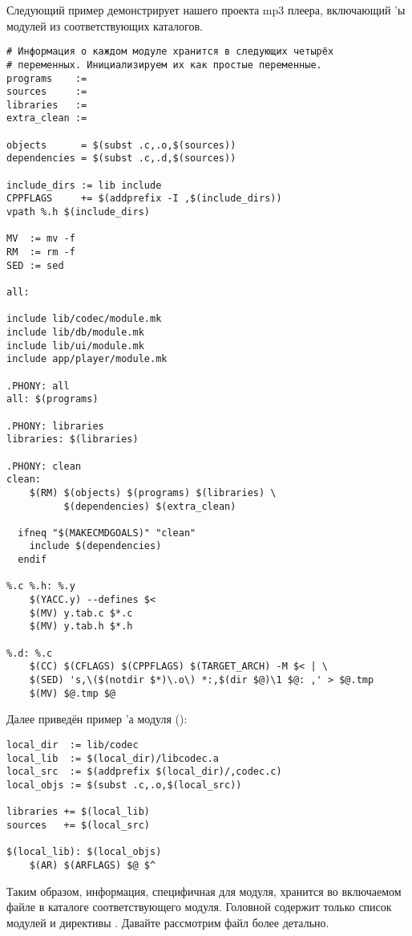 Следующий пример демонстрирует \Makefile{} нашего проекта mp3 плеера,
включающий \Makefile{}'ы модулей из соответствующих каталогов.
{\footnotesize
\begin{verbatim}
# Информация о каждом модуле хранится в следующих четырёх
# переменных. Инициализируем их как простые переменные.
programs    :=
sources     :=
libraries   :=
extra_clean :=

objects      = $(subst .c,.o,$(sources))
dependencies = $(subst .c,.d,$(sources))

include_dirs := lib include
CPPFLAGS     += $(addprefix -I ,$(include_dirs))
vpath %.h $(include_dirs)

MV  := mv -f
RM  := rm -f
SED := sed

all:

include lib/codec/module.mk
include lib/db/module.mk
include lib/ui/module.mk
include app/player/module.mk

.PHONY: all
all: $(programs)

.PHONY: libraries
libraries: $(libraries)

.PHONY: clean
clean:
    $(RM) $(objects) $(programs) $(libraries) \
          $(dependencies) $(extra_clean)

  ifneq "$(MAKECMDGOALS)" "clean"
    include $(dependencies)
  endif

%.c %.h: %.y
    $(YACC.y) --defines $<
    $(MV) y.tab.c $*.c
    $(MV) y.tab.h $*.h

%.d: %.c
    $(CC) $(CFLAGS) $(CPPFLAGS) $(TARGET_ARCH) -M $< | \
    $(SED) 's,\($(notdir $*)\.o\) *:,$(dir $@)\1 $@: ,' > $@.tmp
    $(MV) $@.tmp $@
\end{verbatim}
}

Далее приведён пример \Makefile{}'а модуля 
():
{\footnotesize
\begin{verbatim}
local_dir  := lib/codec
local_lib  := $(local_dir)/libcodec.a
local_src  := $(addprefix $(local_dir)/,codec.c) 
local_objs := $(subst .c,.o,$(local_src))

libraries += $(local_lib)
sources   += $(local_src)

$(local_lib): $(local_objs)
    $(AR) $(ARFLAGS) $@ $^
\end{verbatim}
}

Таким образом, информация, специфичная для модуля, хранится во
включаемом файле в каталоге соответствующего модуля. Головной
\Makefile{} содержит только список модулей и директивы
\directive{include}. Давайте рассмотрим файл 
более детально.

